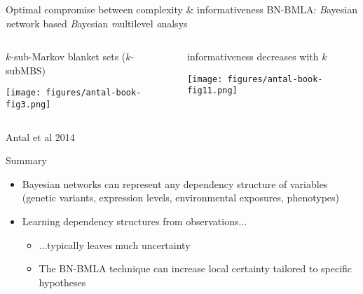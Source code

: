 \documentclass[aspectratio=169]{beamer}
\begin{document}
\begin{frame}{Optimal compromise between complexity \& informativeness}
  {BN-BMLA: \emph{B}ayesian \emph{n}etwork based \emph{B}ayesian \emph{m}ultilevel
  \emph{a}nalsys}

\begin{columns}[t]
\begin{column}{0.5\textwidth}
  $k$-sub-Markov blanket sets ($k$-subMBS)

\texttt{[image: figures/antal-book-fig3.png]}
\end{column}

\begin{column}{0.5\textwidth}
  informativeness decreases with $k$

\texttt{[image: figures/antal-book-fig11.png]}
\end{column}
\end{columns}
\begin{center}
  \tiny{Antal et al 2014}
\end{center}
\end{frame}

\begin{frame}{Summary}
\begin{itemize}
  \item Bayesian networks can represent any dependency structure of variables (genetic variants, expression
    levels, environmental exposures, phenotypes)
  \item Learning dependency structures from observations...
  \begin{itemize}
    \item ...typically leaves much uncertainty
    \item The BN-BMLA technique can increase local certainty tailored to
      specific hypotheses
  \end{itemize}
\end{itemize}
\end{frame}
\end{document}

